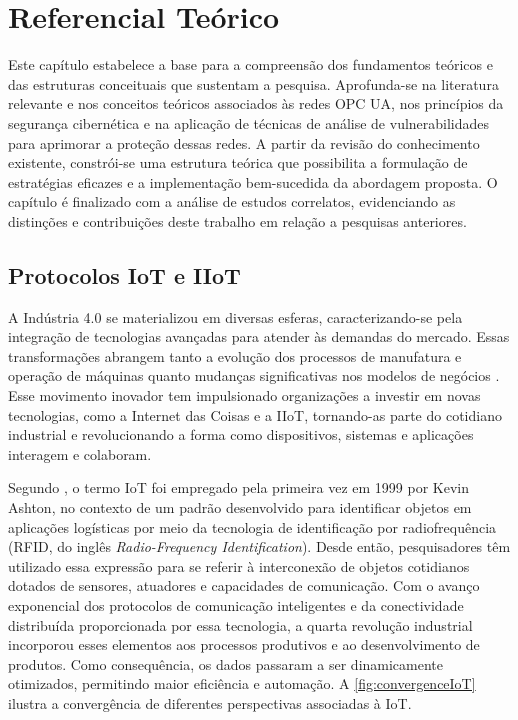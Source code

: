 \chapter{Referencial Teórico} \label{cap:refTeorico}

Este capítulo estabelece a base para a compreensão dos fundamentos teóricos e das estruturas conceituais que sustentam a pesquisa. Aprofunda-se na literatura relevante e nos conceitos teóricos associados às redes OPC UA, nos princípios da segurança cibernética e na aplicação de técnicas de análise de vulnerabilidades para aprimorar a proteção dessas redes. A partir da revisão do conhecimento existente, constrói-se uma estrutura teórica que possibilita a formulação de estratégias eficazes e a implementação bem-sucedida da abordagem proposta. O capítulo é finalizado com a análise de estudos correlatos, evidenciando as distinções e contribuições deste trabalho em relação a pesquisas anteriores.

\section{Protocolos IoT e IIoT} \label{sec:protocolos}
    
    A Indústria 4.0 se materializou em diversas esferas, caracterizando-se pela integração de tecnologias avançadas para atender às demandas do mercado. Essas transformações abrangem tanto a evolução dos processos de manufatura e operação de máquinas quanto mudanças significativas nos modelos de negócios \cite{trotta2018}. Esse movimento inovador tem impulsionado organizações a investir em novas tecnologias, como a Internet das Coisas e a IIoT, tornando-as parte do cotidiano industrial e revolucionando a forma como dispositivos, sistemas e aplicações interagem e colaboram.
    
    Segundo , o termo IoT foi empregado pela primeira vez em 1999 por Kevin Ashton, no contexto de um padrão desenvolvido para identificar objetos em aplicações logísticas por meio da tecnologia de identificação por radiofrequência (RFID, do inglês \textit{Radio-Frequency Identification}). Desde então, pesquisadores têm utilizado essa expressão para se referir à interconexão de objetos cotidianos dotados de sensores, atuadores e capacidades de comunicação. Com o avanço exponencial dos protocolos de comunicação inteligentes e da conectividade distribuída proporcionada por essa tecnologia, a quarta revolução industrial incorporou esses elementos aos processos produtivos e ao desenvolvimento de produtos. Como consequência, os dados passaram a ser dinamicamente otimizados, permitindo maior eficiência e automação. A \autoref{fig:convergenceIoT} ilustra a convergência de diferentes perspectivas associadas à IoT.


